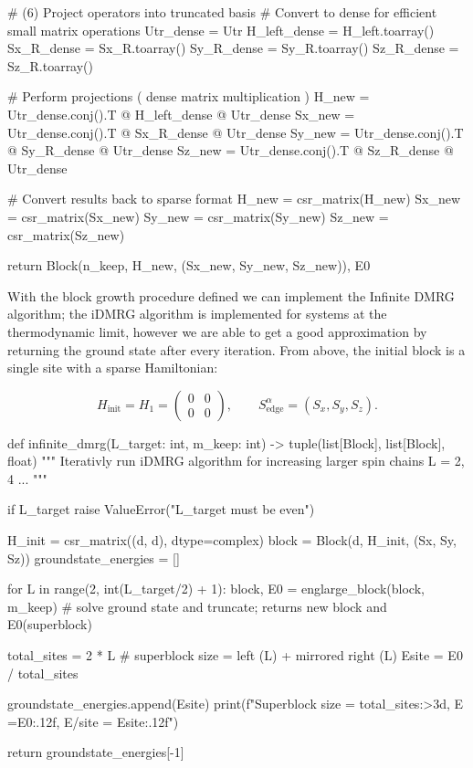 \documentclass{article}
\begin{document}
\begin{python}
        # (6) Project operators into truncated basis
        # Convert to dense for efficient small matrix operations
        Utr_dense = Utr
        H_left_dense = H_left.toarray()
        Sx_R_dense = Sx_R.toarray()
        Sy_R_dense = Sy_R.toarray()
        Sz_R_dense = Sz_R.toarray()

        # Perform projections ( dense matrix multiplication )
        H_new = Utr_dense.conj().T @ H_left_dense @ Utr_dense
        Sx_new = Utr_dense.conj().T @ Sx_R_dense @ Utr_dense
        Sy_new = Utr_dense.conj().T @ Sy_R_dense @ Utr_dense
        Sz_new = Utr_dense.conj().T @ Sz_R_dense @ Utr_dense

        # Convert results back to sparse format
        H_new = csr_matrix(H_new)
        Sx_new = csr_matrix(Sx_new)
        Sy_new = csr_matrix(Sy_new)
        Sz_new = csr_matrix(Sz_new)
    
        return Block(n_keep, H_new, (Sx_new, Sy_new, Sz_new)), E0
\end{python}

\vspace{1em}

\noindent With the block growth procedure defined we can implement the Infinite DMRG algorithm; the iDMRG algorithm is implemented for systems at the thermodynamic limit, however we are able to get a good approximation by returning the ground state after every iteration. From above, the initial block is a single site with a sparse Hamiltonian: 

\[ H_{\mathrm{init}}=H_{1}= \begin{pmatrix} 0 & 0\\ 0 & 0 \end{pmatrix}, 
\qquad S_{\mathrm{edge}}^{\alpha}=(S_x,S_y,S_z). 
\]

\vspace{1em}

\begin{python}
    def infinite_dmrg(L_target: int, m_keep: int) -> tuple(list[Block], list[Block], float)
        """
        Iterativly run iDMRG algorithm for increasing larger spin chains L = 2, 4 ...
        """
            
        if L_target %
            raise ValueError("L_target must be even")
    
        H_init = csr_matrix((d, d), dtype=complex) 
        block = Block(d, H_init, (Sx, Sy, Sz)) 
        groundstate_energies = []
    
        for L in range(2, int(L_target/2) + 1):
            block, E0 = englarge_block(block, m_keep) # solve ground state and truncate; returns new block and E0(superblock)
    
            total_sites = 2 * L # superblock size = left (L) + mirrored right (L)
            Esite = E0 / total_sites
    
            groundstate_energies.append(Esite)               
            print(f"Superblock size = {total_sites:>3d}, E ={E0:.12f}, E/site = {Esite:.12f}")
    
        return groundstate_energies[-1]
\end{python}
\end{document}
